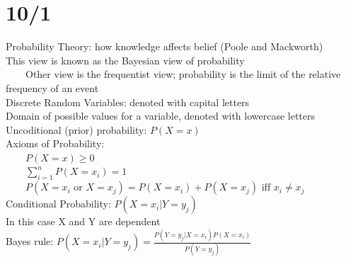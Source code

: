 \documentclass[10pt,letterpaper,unboxed,cm]{article}
\newcommand{\tab}{~~~~}
\begin{document}
\section{10/1}
Probability Theory: how knowledge affects belief (Poole and Mackworth)\\
This view is known as the Bayesian view of probability\\
\tab Other view is the frequentist view; probability is the limit of the relative frequency of an event\\
Discrete Random Variables: denoted with capital letters\\
Domain of possible values for a variable, denoted with lowercase letters\\
Uncoditional (prior) probability: $P(X = x)$\\
Axioms of Probability:\\
\tab $P(X = x) \geq 0$\\
\tab $\sum_{i=1}^n P(X = x_i) = 1$\\
\tab $P(X = x_i \text{ or } X = x_j) = P(X = x_i) + P(X = x_j) \text{ iff } x_i \neq x_j$\\
Conditional Probability: $P(X = x_i | Y = y_j)$\\
In this case X and Y are dependent\\
Bayes rule: $P(X = x_i | Y = y_j) = \frac{P(Y = y_j | X = x_i)P(X = x_i)}{P(Y = y_j)}$\\
\end{document}
